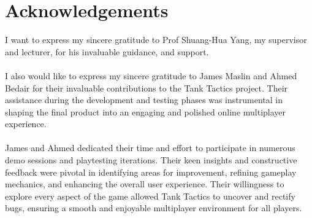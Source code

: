 \chapter*{\center \Large  Acknowledgements}
I want to express my sincere gratitude to Prof Shuang-Hua Yang, my supervisor and lecturer, for his invaluable guidance, and support.
\\
\noindent
\\
I also would like to express my sincere gratitude to James Maslin and Ahmed Bedair for their invaluable contributions to the Tank Tactics project. Their assistance during the development and testing phases was instrumental in shaping the final product into an engaging and polished online multiplayer experience.
\\
\noindent
\\
James and Ahmed dedicated their time and effort to participate in numerous demo sessions and playtesting iterations. Their keen insights and constructive feedback were pivotal in identifying areas for improvement, refining gameplay mechanics, and enhancing the overall user experience. Their willingness to explore every aspect of the game allowed Tank Tactics to uncover and rectify bugs, ensuring a smooth and enjoyable multiplayer environment for all players.
